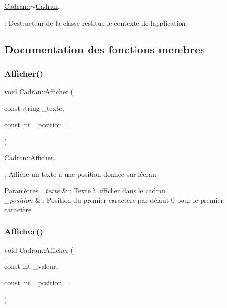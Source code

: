 \hyperlink{class_cadran_ae710cda2ec2d5b84d33599a9dc37893b}{Cadran\+::$\sim$\+Cadran}. 

\+: Destructeur de la classe restitue le contexte de l\textquotesingle{}application 

\subsection{Documentation des fonctions membres}
\mbox{\label{class_cadran_a3cbd2586cd8c0a0b52f4a0558f1a32a1}} 
\subsubsection{\texorpdfstring{Afficher()}{Afficher()}\hspace{0.1cm}{\footnotesize\ttfamily [1/2]}}
{\footnotesize\ttfamily void Cadran\+::\+Afficher (\begin{DoxyParamCaption}\item[{const string}]{\+\_\+texte,  }\item[{const int}]{\+\_\+position = {} }\end{DoxyParamCaption})}



\hyperlink{class_cadran_a3cbd2586cd8c0a0b52f4a0558f1a32a1}{Cadran\+::\+Afficher}. 

\+: Affiche un texte à une position donnée sur l\textquotesingle{}écran 
\begin{DoxyParams}{Paramètres}
{\em \+\_\+texte} & \+: Texte à afficher dans le cadran \\
\hline
{\em \+\_\+position} & \+: Position du premier caractère par défaut 0 pour le premier caractère \\
\hline
\end{DoxyParams}
\mbox{\label{class_cadran_a3e85b675d09c46cca13aae23acc4c6e0}} 
\subsubsection{\texorpdfstring{Afficher()}{Afficher()}\hspace{0.1cm}{\footnotesize\ttfamily [2/2]}}
{\footnotesize\ttfamily void Cadran\+::\+Afficher (\begin{DoxyParamCaption}\item[{const int}]{\+\_\+valeur,  }\item[{const int}]{\+\_\+position = {} }\end{DoxyParamCaption})}



